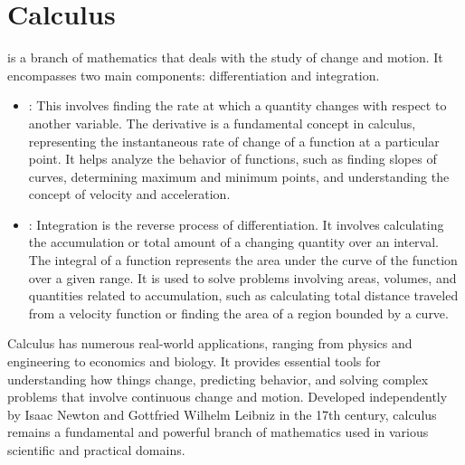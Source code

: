 \chapter{Calculus}
\thispagestyle{fancy}

 is a branch of mathematics that deals with the study of change and motion. It encompasses two main components: differentiation and integration.

\begin{itemize}
	\item {}: This involves finding the rate at which a quantity changes with respect to another variable. The derivative is a fundamental concept in calculus, representing the instantaneous rate of change of a function at a particular point. It helps analyze the behavior of functions, such as finding slopes of curves, determining maximum and minimum points, and understanding the concept of velocity and acceleration.
	
	\item {}: Integration is the reverse process of differentiation. It involves calculating the accumulation or total amount of a changing quantity over an interval. The integral of a function represents the area under the curve of the function over a given range. It is used to solve problems involving areas, volumes, and quantities related to accumulation, such as calculating total distance traveled from a velocity function or finding the area of a region bounded by a curve.
\end{itemize}

Calculus has numerous real-world applications, ranging from physics and engineering to economics and biology. It provides essential tools for understanding how things change, predicting behavior, and solving complex problems that involve continuous change and motion. Developed independently by Isaac Newton and Gottfried Wilhelm Leibniz in the 17th century, calculus remains a fundamental and powerful branch of mathematics used in various scientific and practical domains.